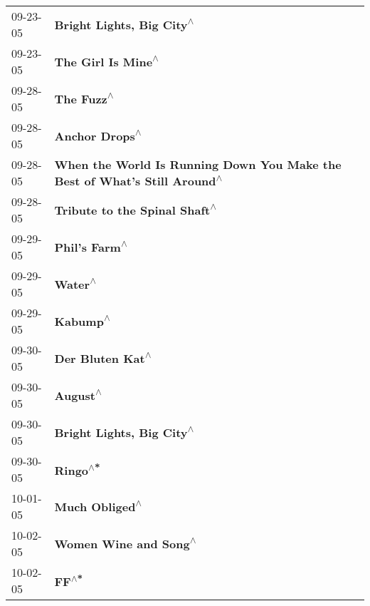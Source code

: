 \begin{supertabular}{p{0.25\columnwidth}p{0.75\columnwidth}}
 09-23-05 &                                                  \textbf{Bright Lights, Big City\textsuperscript{$\wedge$}} \\
 09-23-05 &                                                         \textbf{The Girl Is Mine\textsuperscript{$\wedge$}} \\
 09-28-05 &                                                                 \textbf{The Fuzz\textsuperscript{$\wedge$}} \\
 09-28-05 &                                                             \textbf{Anchor Drops\textsuperscript{$\wedge$}} \\
 09-28-05 &  \textbf{When the World Is Running Down You Make the Best of What's Still Around\textsuperscript{$\wedge$}} \\
 09-28-05 &                                              \textbf{Tribute to the Spinal Shaft\textsuperscript{$\wedge$}} \\
 09-29-05 &                                                              \textbf{Phil's Farm\textsuperscript{$\wedge$}} \\
 09-29-05 &                                                                    \textbf{Water\textsuperscript{$\wedge$}} \\
 09-29-05 &                                                                   \textbf{Kabump\textsuperscript{$\wedge$}} \\
 09-30-05 &                                                           \textbf{Der Bluten Kat\textsuperscript{$\wedge$}} \\
 09-30-05 &                                                                   \textbf{August\textsuperscript{$\wedge$}} \\
 09-30-05 &                                                  \textbf{Bright Lights, Big City\textsuperscript{$\wedge$}} \\
 09-30-05 &                                                                   \textbf{Ringo\textsuperscript{$\wedge$*}} \\
 10-01-05 &                                                             \textbf{Much Obliged\textsuperscript{$\wedge$}} \\
 10-02-05 &                                                      \textbf{Women Wine and Song\textsuperscript{$\wedge$}} \\
 10-02-05 &                                                                      \textbf{FF\textsuperscript{$\wedge$*}} \\

\end{supertabular}
